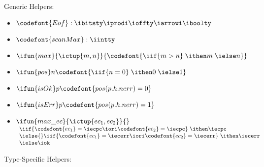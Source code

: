 
Generic Helpers:

{\small
\begin{itemize}
\newcommand{\labelitemi}{}
\item $\codefont {Eof} : \ibitsty \iprodi \ioffty \iarrowi \iboolty$

\item $\codefont{scanMax} : \iintty$

\item $\ifun {max} {\ictup{m,n}} {\codefont{\iif {m>n}\; \ithen m\; \ielse n}}$
\item $\ifun {pos} n {\codefont{\iif {n=0}\; \ithen 0\; \ielse 1}}$
\item $\ifun {isOk} p {\codefont{pos(p.h.nerr) = 0}}$
\item $\ifun {isErr} p {\codefont{pos(p.h.nerr) = 1}}$

\item $\ifun {max\_ec} {\ictup{ec_1, ec_2}} {}$ \\
  $\begin{array}{l}
    \iif {\codefont{ec_1} = \iecpc \iori \codefont{ec_2} = \iecpc}\; \ithen \iecpc \\
    \ielse{} \iif {\codefont{ec_1} = \iecerr \iori \codefont{ec_2} = \iecerr}\; \ithen \iecerr \\
    \ielse \iok
   \end{array}$
\end{itemize}
}


\noindent
Type-Specific Helpers:

